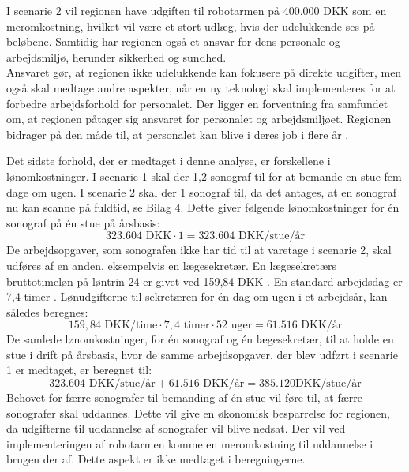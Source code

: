 I scenarie 2 vil regionen have udgiften til robotarmen på 400.000 DKK som en meromkostning, hvilket vil være et stort udlæg, hvis der udelukkende ses på beløbene. Samtidig har regionen også et ansvar for dens personale og arbejdsmiljø, herunder sikkerhed og sundhed. \\
Ansvaret gør, at regionen ikke udelukkende kan fokusere på direkte udgifter, men også skal medtage andre aspekter, når en ny teknologi skal implementeres for at forbedre arbejdsforhold for personalet. Der ligger en forventning fra samfundet om, at regionen påtager sig ansvaret for personalet og arbejdsmiljøet. Regionen bidrager på den måde til, at personalet kan blive i deres job i flere år \cite{Arbejdsmiljo}\cite{RegionAnsvar}. 

Det sidste forhold, der er medtaget i denne analyse, er forskellene i lønomkostninger. I scenarie 1 skal der 1,2 sonograf til for at bemande en stue fem dage om ugen. I scenarie 2 skal der 1 sonograf til, da det antages, at en sonograf nu kan scanne på fuldtid, se Bilag 4. Dette giver følgende lønomkostninger for én sonograf på én stue på årsbasis:
\begin{equation}
323.604 \text{ DKK}\cdot1 = 323.604 \text{ DKK/stue/år}
\end{equation}
De arbejdsopgaver, som sonografen ikke har tid til at varetage i scenarie 2, skal udføres af en anden, eksempelvis en lægesekretær. En lægesekretærs bruttotimeløn på løntrin 24 er givet ved 159,84 DKK \cite{Lontabel}. En standard arbejdsdag er 7,4 timer \cite{Arbejdstid}. Lønudgifterne til sekretæren for én dag om ugen i et arbejdsår, kan således beregnes:
\begin{equation}
159,84 \text{ DKK/time} \cdot 7,4 \text{ timer} \cdot 52 \text{ uger} = 61.516 \text{ DKK/år}
\end{equation}
De samlede lønomkostninger, for én sonograf og én lægesekretær, til at holde en stue i drift på årsbasis, hvor de samme arbejdsopgaver, der blev udført i scenarie 1 er medtaget, er beregnet til:
\begin{equation}
323.604 \text{ DKK/stue/år} + 61.516 \text{ DKK/år} = 385.120 \text{DKK/stue/år}
\end{equation}
Behovet for færre sonografer til bemanding af én stue vil føre til, at færre sonografer skal uddannes. Dette vil give en økonomisk besparrelse for regionen, da udgifterne til uddannelse af sonografer vil blive nedsat. Der vil ved implementeringen af robotarmen komme en meromkostning til uddannelse i brugen der af. Dette aspekt er ikke medtaget i beregningerne. 

